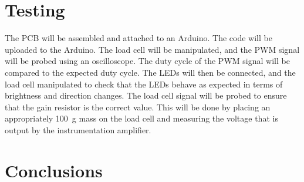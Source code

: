 \documentclass[twoside]{article}
\begin{document}
\section{Testing}
    The PCB will be assembled and attached to an Arduino. The code will be uploaded to the Arduino. The load cell will be manipulated, and the PWM signal will be probed using an oscilloscope. The duty cycle of the PWM signal will be compared to the expected duty cycle.
    The LEDs will then be connected, and the load cell manipulated to check that the LEDs behave as expected in terms of brightness and direction changes. 
    The load cell signal will be probed to ensure that the gain resistor is the correct value. This will be done by placing an appropriately \SI{100}{\gram} mass on the load cell and measuring the voltage that is output by the instrumentation amplifier.

\section{Conclusions}
\newpage
\printbibliography
\end{document}

